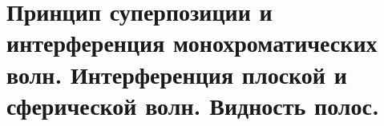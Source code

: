 \section{Принцип суперпозиции и интерференция монохроматических волн. Интерференция плоской и сферической волн. Видность полос.}